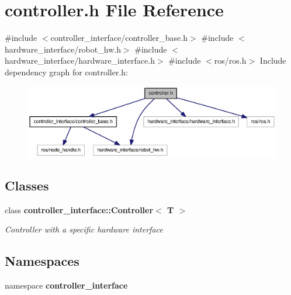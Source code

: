 \section{controller.\-h \-File \-Reference}
\label{controller_8h}
{\ttfamily \#include $<$controller\-\_\-interface/controller\-\_\-base.\-h$>$}\*
{\ttfamily \#include $<$hardware\-\_\-interface/robot\-\_\-hw.\-h$>$}\*
{\ttfamily \#include $<$hardware\-\_\-interface/hardware\-\_\-interface.\-h$>$}\*
{\ttfamily \#include $<$ros/ros.\-h$>$}\*
\-Include dependency graph for controller.\-h\-:
\nopagebreak
\begin{figure}[H]
\begin{center}
\leavevmode
\includegraphics[width=350pt]{controller_8h__incl}
\end{center}
\end{figure}
\subsection*{\-Classes}
\begin{DoxyCompactItemize}
\item 
class {\bf controller\-\_\-interface\-::\-Controller$<$ T $>$}
\begin{DoxyCompactList}\small\item\em \-Controller with a specific hardware interface \end{DoxyCompactList}\end{DoxyCompactItemize}
\subsection*{\-Namespaces}
\begin{DoxyCompactItemize}
\item 
namespace {\bf controller\-\_\-interface}
\end{DoxyCompactItemize}
